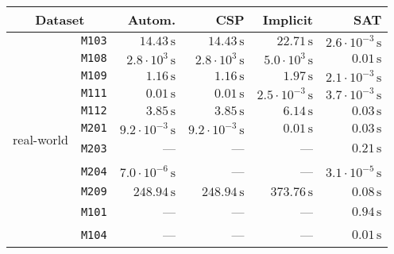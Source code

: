 \begin{tabular}{cc|rrrr}
\multicolumn{2}{|c|}{                 Dataset} &                        Autom. &                           CSP &                      Implicit &                           SAT\\
\hline
\multirow{20}{|c|}{real-world}
 & \texttt{\footnotesize                 M103} & $            14.43\,\text{s}$ & $            14.43\,\text{s}$ & $            22.71\,\text{s}$ & $ 2.6\cdot 10^{-3}\,\text{s}$\\
 & \texttt{\footnotesize                 M108} & $  2.8\cdot 10^{3}\,\text{s}$ & $  2.8\cdot 10^{3}\,\text{s}$ & $  5.0\cdot 10^{3}\,\text{s}$ & $             0.01\,\text{s}$\\
 & \texttt{\footnotesize                 M109} & $             1.16\,\text{s}$ & $             1.16\,\text{s}$ & $             1.97\,\text{s}$ & $ 2.1\cdot 10^{-3}\,\text{s}$\\
 & \texttt{\footnotesize                 M111} & $             0.01\,\text{s}$ & $             0.01\,\text{s}$ & $ 2.5\cdot 10^{-3}\,\text{s}$ & $ 3.7\cdot 10^{-3}\,\text{s}$\\
 & \texttt{\footnotesize                 M112} & $             3.85\,\text{s}$ & $             3.85\,\text{s}$ & $             6.14\,\text{s}$ & $             0.03\,\text{s}$\\
 & \texttt{\footnotesize                 M201} & $ 9.2\cdot 10^{-3}\,\text{s}$ & $ 9.2\cdot 10^{-3}\,\text{s}$ & $             0.01\,\text{s}$ & $             0.03\,\text{s}$\\
 & \texttt{\footnotesize                 M203} &                             — &                             — &                             — & $             0.21\,\text{s}$\\
 & \texttt{\footnotesize                 M204} & $ 7.0\cdot 10^{-6}\,\text{s}$ &                             — &                             — & $ 3.1\cdot 10^{-5}\,\text{s}$\\
 & \texttt{\footnotesize                 M209} & $           248.94\,\text{s}$ & $           248.94\,\text{s}$ & $           373.76\,\text{s}$ & $             0.08\,\text{s}$\\
 & \texttt{\footnotesize                 M101} &                             — &                             — &                             — & $             0.94\,\text{s}$\\
 & \texttt{\footnotesize                 M104} &                             — &                             — &                             — & $             0.01\,\text{s}$\\

\end{tabular}
